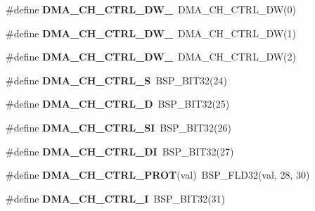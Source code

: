 \begin{DoxyCompactItemize}
\mbox{\label{group__lpc__dma_gafcd6ee11ff036a2092ca0129eea0e748}} 
\#define {\bfseries D\+M\+A\+\_\+\+C\+H\+\_\+\+C\+T\+R\+L\+\_\+\+D\+W\+\_}~D\+M\+A\+\_\+\+C\+H\+\_\+\+C\+T\+R\+L\+\_\+\+DW(0)
\item 
\mbox{\label{group__lpc__dma_gab2a3d182d702a9e5be3a4584baddf20d}} 
\#define {\bfseries D\+M\+A\+\_\+\+C\+H\+\_\+\+C\+T\+R\+L\+\_\+\+D\+W\+\_}~D\+M\+A\+\_\+\+C\+H\+\_\+\+C\+T\+R\+L\+\_\+\+DW(1)
\item 
\mbox{\label{group__lpc__dma_gac203e292283ecfdf21a435f8187c5d88}} 
\#define {\bfseries D\+M\+A\+\_\+\+C\+H\+\_\+\+C\+T\+R\+L\+\_\+\+D\+W\+\_}~D\+M\+A\+\_\+\+C\+H\+\_\+\+C\+T\+R\+L\+\_\+\+DW(2)
\item 
\mbox{\label{group__lpc__dma_ga1483a16612437fa47ae3a289d55dcb7f}} 
\#define {\bfseries D\+M\+A\+\_\+\+C\+H\+\_\+\+C\+T\+R\+L\+\_\+S}~B\+S\+P\+\_\+\+B\+I\+T32(24)
\item 
\mbox{\label{group__lpc__dma_ga98b49b76b7f99354f5835000f61b8c37}} 
\#define {\bfseries D\+M\+A\+\_\+\+C\+H\+\_\+\+C\+T\+R\+L\+\_\+D}~B\+S\+P\+\_\+\+B\+I\+T32(25)
\item 
\mbox{\label{group__lpc__dma_gabca8e51927f788cc2f9b9c7480058990}} 
\#define {\bfseries D\+M\+A\+\_\+\+C\+H\+\_\+\+C\+T\+R\+L\+\_\+\+SI}~B\+S\+P\+\_\+\+B\+I\+T32(26)
\item 
\mbox{\label{group__lpc__dma_ga7ebd58a09b0f9ecb08b25a5c2b49601f}} 
\#define {\bfseries D\+M\+A\+\_\+\+C\+H\+\_\+\+C\+T\+R\+L\+\_\+\+DI}~B\+S\+P\+\_\+\+B\+I\+T32(27)
\item 
\mbox{\label{group__lpc__dma_gaf562a65da1119e01aa492304cea37d97}} 
\#define {\bfseries D\+M\+A\+\_\+\+C\+H\+\_\+\+C\+T\+R\+L\+\_\+\+P\+R\+OT}(val)~B\+S\+P\+\_\+\+F\+L\+D32(val, 28, 30)
\item 
\mbox{\label{group__lpc__dma_ga8d3395c768f96cf39cfff738be99b9a0}} 
\#define {\bfseries D\+M\+A\+\_\+\+C\+H\+\_\+\+C\+T\+R\+L\+\_\+I}~B\+S\+P\+\_\+\+B\+I\+T32(31)
\end{DoxyCompactItemize}
